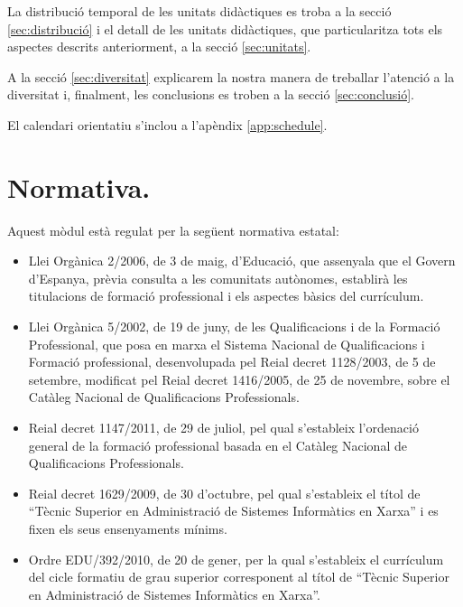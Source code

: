 \documentclass[catalan, a4paper, 12pt, titlepage]{article}
\begin{document}
La distribució temporal de les unitats didàctiques es troba a la secció \ref{sec:distribució} i el detall de les unitats didàctiques, que particularitza tots els aspectes descrits anteriorment, a la secció \ref{sec:unitats}.

A la secció \ref{sec:diversitat} explicarem la nostra manera de treballar l'atenció a la diversitat i, finalment, les conclusions es troben a la secció \ref{sec:conclusió}.

El calendari orientatiu s'inclou a l'apèndix \ref{app:schedule}.

\section{Normativa.}
\label{sec:normativa}

Aquest mòdul està regulat per la següent normativa estatal:
\begin{itemize}
	\item Llei Orgànica 2/2006, de 3 de maig, d'Educació, que assenyala que el Govern d'Espanya, prèvia consulta a les comunitats autònomes, establirà les titulacions de formació professional i els aspectes bàsics del currículum.
	\item Llei Orgànica 5/2002, de 19 de juny, de les Qualificacions i de la Formació Professional, que posa en marxa el Sistema Nacional de Qualificacions i Formació professional, desenvolupada pel Reial decret 1128/2003, de 5 de setembre, modificat pel Reial decret 1416/2005, de 25 de novembre, sobre el Catàleg Nacional de Qualificacions Professionals.
	\item Reial decret 1147/2011, de 29 de juliol, pel qual s'estableix l'ordenació general de la formació professional basada en el Catàleg Nacional de Qualificacions Professionals.
	\item Reial decret 1629/2009, de 30 d'octubre, pel qual s'estableix el títol de ``Tècnic Superior en Administració de Sistemes Informàtics en Xarxa'' i es fixen els seus ensenyaments mínims.
	\item Ordre EDU/392/2010, de 20 de gener, per la qual s'estableix el currículum del cicle formatiu de grau superior corresponent al títol de ``Tècnic Superior en Administració de Sistemes Informàtics en Xarxa''.
\end{itemize}
\end{document}
